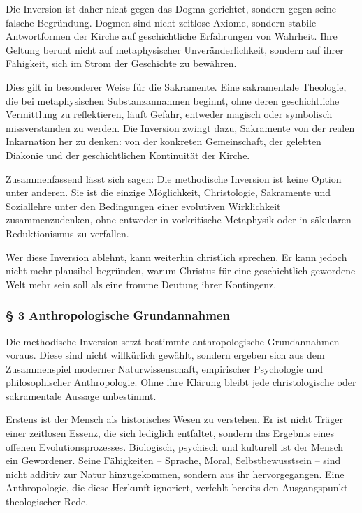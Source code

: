 \documentclass[
  ngerman,
]{article}
\begin{document}
Die Inversion ist daher nicht gegen das Dogma gerichtet, sondern gegen
seine falsche Begründung. Dogmen sind nicht zeitlose Axiome, sondern
stabile Antwortformen der Kirche auf geschichtliche Erfahrungen von
Wahrheit. Ihre Geltung beruht nicht auf metaphysischer
Unveränderlichkeit, sondern auf ihrer Fähigkeit, sich im Strom der
Geschichte zu bewähren.

Dies gilt in besonderer Weise für die Sakramente. Eine sakramentale
Theologie, die bei metaphysischen Substanzannahmen beginnt, ohne deren
geschichtliche Vermittlung zu reflektieren, läuft Gefahr, entweder
magisch oder symbolisch missverstanden zu werden. Die Inversion zwingt
dazu, Sakramente von der realen Inkarnation her zu denken: von der
konkreten Gemeinschaft, der gelebten Diakonie und der geschichtlichen
Kontinuität der Kirche.

Zusammenfassend lässt sich sagen: Die methodische Inversion ist keine
Option unter anderen. Sie ist die einzige Möglichkeit, Christologie,
Sakramente und Soziallehre unter den Bedingungen einer evolutiven
Wirklichkeit zusammenzudenken, ohne entweder in vorkritische Metaphysik
oder in säkularen Reduktionismus zu verfallen.

Wer diese Inversion ablehnt, kann weiterhin christlich sprechen. Er kann
jedoch nicht mehr plausibel begründen, warum Christus für eine
geschichtlich gewordene Welt mehr sein soll als eine fromme Deutung
ihrer Kontingenz.

\subsubsection{§ 3 Anthropologische
Grundannahmen}\label{anthropologische-grundannahmen}

Die methodische Inversion setzt bestimmte anthropologische Grundannahmen
voraus. Diese sind nicht willkürlich gewählt, sondern ergeben sich aus
dem Zusammenspiel moderner Naturwissenschaft, empirischer Psychologie
und philosophischer Anthropologie. Ohne ihre Klärung bleibt jede
christologische oder sakramentale Aussage unbestimmt.

Erstens ist der Mensch als historisches Wesen zu verstehen. Er ist nicht
Träger einer zeitlosen Essenz, die sich lediglich entfaltet, sondern das
Ergebnis eines offenen Evolutionsprozesses. Biologisch, psychisch und
kulturell ist der Mensch ein Gewordener. Seine Fähigkeiten -- Sprache,
Moral, Selbstbewusstsein -- sind nicht additiv zur Natur hinzugekommen,
sondern aus ihr hervorgegangen. Eine Anthropologie, die diese Herkunft
ignoriert, verfehlt bereits den Ausgangspunkt theologischer Rede.
\end{document}
